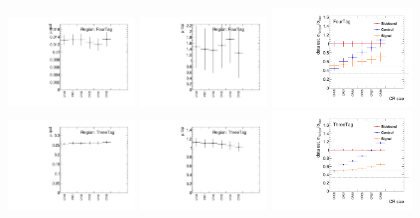 \begin{figure}[htbp!]
\begin{center}
\includegraphics[angle=270, width=0.3\textwidth]{./figures/boosted/Appendix_SB/FourTag_muqcdCR.pdf}
\includegraphics[angle=270, width=0.3\textwidth]{./figures/boosted/Appendix_SB/FourTag_mutopCR.pdf}
\includegraphics[angle=270, width=0.33\textwidth]{./figures/boosted/Appendix_SB/data_est_FourTag_sigma_compareCR.pdf}\\
\includegraphics[angle=270, width=0.3\textwidth]{./figures/boosted/Appendix_SB/ThreeTag_muqcdCR.pdf}
\includegraphics[angle=270, width=0.3\textwidth]{./figures/boosted/Appendix_SB/ThreeTag_mutopCR.pdf}
\includegraphics[angle=270, width=0.33\textwidth]{./figures/boosted/Appendix_SB/data_est_ThreeTag_sigma_compareCR.pdf}\\

\end{center}
\end{figure}
